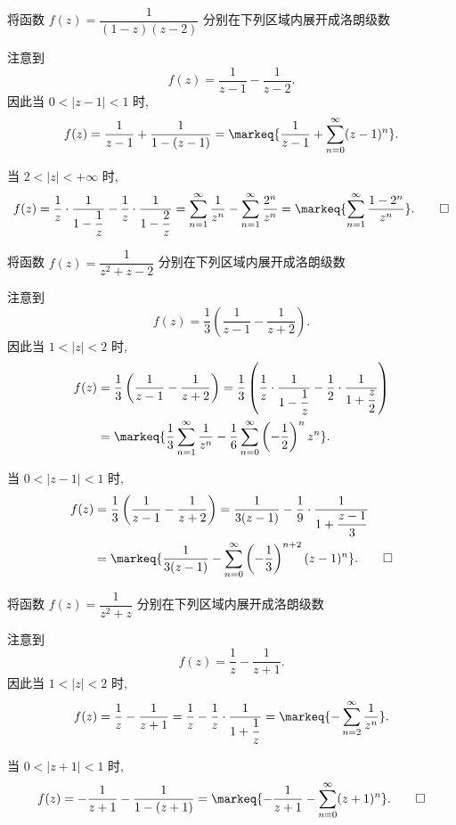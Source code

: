 \begin{exercise}[2]
	将函数 $f(z)=\dfrac1{(1-z)(z-2)}$ 分别在下列区域内展开成洛朗级数
\end{exercise}
\begin{solution}
	\subex 注意到
	\[f(z)=\frac1{z-1}-\frac1{z-2}.\]
	因此当 $0<|z-1|<1$ 时,
	\[f(z)=\frac1{z-1}+\frac1{1-(z-1)}
	=\markeq{\frac1{z-1}+\sum_{n=0}^\infty (z-1)^n}.\]
	
	\subex 当 $2<|z|<+\infty$ 时,
	\[f(z)=\frac1z\cdot\frac1{1-\dfrac1z}-\frac1z\cdot\frac1{1-\dfrac2z}
	=\sum_{n=1}^\infty\frac1{z^n}-\sum_{n=1}^\infty \frac{2^n}{z^n}
	=\markeq{\sum_{n=1}^\infty\frac{1-2^n}{z^n}}.\qedhere\]
\end{solution}


\begin{exercise}[2]
	将函数 $f(z)=\dfrac1{z^2+z-2}$ 分别在下列区域内展开成洛朗级数
\end{exercise}
\begin{solution}
	\subex 注意到
	\[f(z)=\frac13\left(\frac1{z-1}-\frac1{z+2}\right).\]
	因此当 $1<|z|<2$ 时,
	\begin{align*}
		f(z)&=\frac13\left(\frac1{z-1}-\frac1{z+2}\right)
	=\frac13\left(\frac1z\cdot\frac1{1-\dfrac1z}-\frac12\cdot\frac1{1+\dfrac z2}\right)\\
	&=\markeq{\frac13\sum_{n=1}^\infty \frac1{z^n}
	-\frac16\sum_{n=0}^\infty \left(-\frac12\right)^nz^n}.
\end{align*}
	
	\subex 当 $0<|z-1|<1$ 时,
	\begin{align*}
	f(z)&=\frac13\left(\frac1{z-1}-\frac1{z+2}\right)
	=\frac1{3(z-1)}-\frac19\cdot\frac1{1+\dfrac{z-1}3}\\
	&=\markeq{\frac1{3(z-1)}-\sum_{n=0}^\infty\left(-\frac13\right)^{n+2}(z-1)^n}.\qedhere
\end{align*}
\end{solution}


\begin{exercise}[2]
	将函数 $f(z)=\dfrac1{z^2+z}$ 分别在下列区域内展开成洛朗级数
\end{exercise}
\begin{solution}
	\subex 注意到
	\[f(z)=\frac1z-\frac1{z+1}.\]
	因此当 $1<|z|<2$ 时,
	\[f(z)=\frac1z-\frac1{z+1}
	=\frac1z-\frac1z\cdot\frac1{1+\dfrac1z}
	=\markeq{-\sum_{n=2}^\infty\frac1{z^n}}.\]
	
	\subex 当 $0<|z+1|<1$ 时,
	\[f(z)=-\frac1{z+1}-\frac1{1-(z+1)}
	=\markeq{-\frac1{z+1}-\sum_{n=0}^\infty(z+1)^n}.\qedhere\]
\end{solution}


